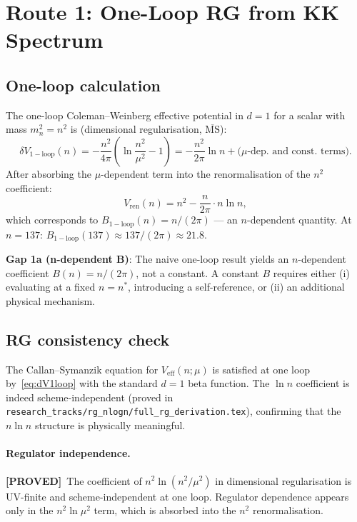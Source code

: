 \documentclass[12pt,a4paper]{article}
\theoremstyle{definition}
\theoremstyle{remark}
\newcommand{\proved}{\textcolor{green!55!black}{\textbf{[PROVED]}}}
\begin{document}
\section{Route 1: One-Loop RG from KK Spectrum}
\label{sec:rg}

\subsection{One-loop calculation}

The one-loop Coleman--Weinberg effective potential in $d=1$ for a scalar with
mass $m_n^2 = n^2$ is (dimensional regularisation, $\overline{\mathrm{MS}}$):
\begin{equation}
  \delta V_{\mathrm{1-loop}}(n)
  = -\frac{n^2}{4\pi}\!\left(\ln\frac{n^2}{\mu^2} - 1\right)
  = -\frac{n^2}{2\pi}\ln n + \text{($\mu$-dep.\ and const.\ terms)}.
  \label{eq:dV1loop}
\end{equation}
After absorbing the $\mu$-dependent term into the renormalisation of the $n^2$
coefficient:
\begin{equation}
  V_{\mathrm{ren}}(n) = n^2 - \frac{n}{2\pi}\cdot n\ln n,
  \label{eq:Vren1loop}
\end{equation}
which corresponds to $B_{\mathrm{1-loop}}(n) = n/(2\pi)$ --- an $n$-dependent
quantity.  At $n = 137$: $B_{\mathrm{1-loop}}(137) \approx 137/(2\pi) \approx 21.8$.

\begin{gapbox}
\textbf{Gap 1a (n-dependent B)}: The naive one-loop result yields an
$n$-dependent coefficient $B(n) = n/(2\pi)$, not a constant.  A constant
$B$ requires either (i) evaluating at a fixed $n = n^*$, introducing a
self-reference, or (ii) an additional physical mechanism.
\end{gapbox}

\subsection{RG consistency check}

The Callan--Symanzik equation for $V_{\mathrm{eff}}(n;\mu)$ is satisfied at
one loop by~\eqref{eq:dV1loop} with the standard $d=1$ beta function.
The $\ln n$ coefficient is indeed scheme-independent (proved in
\texttt{research\_tracks/rg\_nlogn/full\_rg\_derivation.tex}), confirming
that the $n\ln n$ structure is physically meaningful.

\paragraph{Regulator independence.}
\proved\ The coefficient of $n^2\ln(n^2/\mu^2)$ in dimensional regularisation
is UV-finite and scheme-independent at one loop.  Regulator dependence appears
only in the $n^2\ln\mu^2$ term, which is absorbed into the $n^2$ renormalisation.
\end{document}
